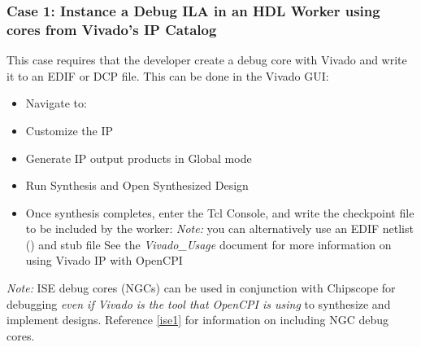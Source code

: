 \begin{flushleft}
\subsubsection{Case 1: Instance a Debug ILA in an HDL Worker using cores from Vivado's IP Catalog}
This case requires that the developer create a debug core with Vivado and write it to an EDIF or DCP file. This can be done in the Vivado GUI:
\begin{itemize}
	\item Navigate to:\newline {}
	\item Customize the IP
	\item Generate IP output products in Global mode
	\item Run Synthesis and Open Synthesized Design
	\item Once synthesis completes, enter the Tcl Console, and write the checkpoint file to be included by the worker:
		\subitem {}
		\subitem \textit{Note:} you can alternatively use an EDIF netlist () and stub file
		\subitem * See the \textit{Vivado\_Usage} document for more information on using Vivado IP with OpenCPI
\end{itemize}

\textit{Note:} ISE debug cores (NGCs) can be used in conjunction with Chipscope for debugging \textit{even if Vivado is the tool that OpenCPI is using} to synthesize and implement designs. Reference \ref{ise1} for information on including NGC debug cores.\newline


\end{flushleft}
